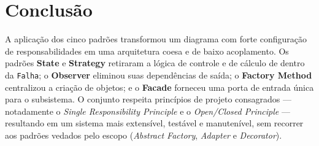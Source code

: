 \documentclass[10pt]{article}
\begin{document}
\newpage



\section{Conclusão}

A aplicação dos cinco padrões transformou um diagrama com forte configuração de
responsabilidades em uma arquitetura coesa e de baixo acoplamento. Os padrões
\textbf{State} e \textbf{Strategy} retiraram a lógica de controle e de cálculo de
dentro da \texttt{Falha}; o \textbf{Observer} eliminou suas dependências de
saída; o \textbf{Factory Method} centralizou a criação de objetos; e o
\textbf{Facade} forneceu uma porta de entrada única para o subsistema. O conjunto
respeita princípios de projeto consagrados --- notadamente o \textit{Single
Responsibility Principle} e o \textit{Open/Closed Principle} --- resultando em um
sistema mais extensível, testável e manutenível, sem recorrer aos padrões
vedados pelo escopo (\textit{Abstract Factory}, \textit{Adapter} e
\textit{Decorator}).



\appendix  
\clearpage 
\end{document}
